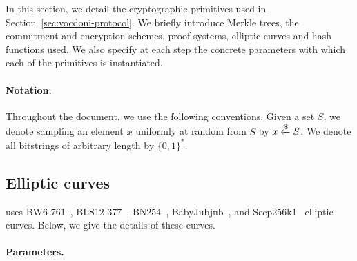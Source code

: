 
In this section, we detail the cryptographic primitives used in Section~\ref{sec:vocdoni-protocol}. We briefly introduce Merkle trees, the commitment and encryption schemes, proof systems, elliptic curves and hash functions used. We also specify at each step the concrete parameters with which each of the primitives is instantiated.\\


\paragraph{Notation.} Throughout the document, we use the following conventions. Given a set $S$, we denote sampling an element $x$ uniformly at random from $S$ by $x \xleftarrow{\$} S$. We denote all bitstrings of arbitrary length by $\{0,1\}^*$. 

\subsection{Elliptic curves}
\label{sec:cryptographic-primitives:elliptic-curves}

\davinci uses BW6-761~\cite{elhousni20optimized}, BLS12-377~\cite{bowe20zexe}, BN254~\cite{jancar20bn256}, BabyJubjub~\cite{belles21twisted}, and Secp256k1~\cite{brown10sec} elliptic curves. Below, we give the details of these curves.

\paragraph{Parameters.}

